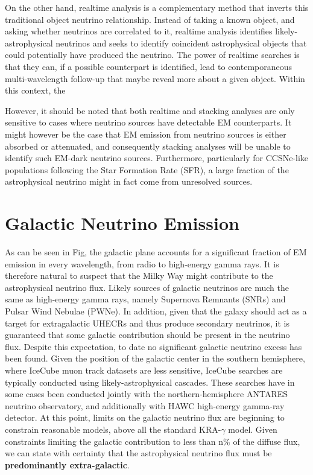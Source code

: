 On the other hand, realtime analysis is a complementary method that inverts this traditional object neutrino relationship. Instead of taking a known object, and asking whether neutrinos are correlated to it, realtime analysis identifies likely-astrophysical neutrinos and seeks to identify coincident astrophysical objects that could potentially have produced the neutrino. The power of realtime searches is that they can, if a possible counterpart is identified, lead to contemporaneous multi-wavelength follow-up that maybe reveal more about a given object. Within this context, the 

However, it should be noted that both realtime and stacking analyses are only sensitive to cases where neutrino sources have detectable EM counterparts. It might however be the case that EM emission from neutrino sources is either absorbed or attenuated, and consequently stacking analyses will be unable to identify such EM-dark neutrino sources. Furthermore, particularly for CCSNe-like populations following the Star Formation Rate (SFR), a large fraction of the astrophysical neutrino might in fact come from unresolved sources.

\section{Galactic Neutrino Emission}

As can be seen in Fig, the galactic plane accounts for a significant fraction of EM emission in every wavelength, from radio to high-energy gamma rays. It is therefore natural to suspect that the Milky Way might contribute to the astrophysical neutrino flux. Likely sources of galactic neutrinos are much the same as high-energy gamma rays, namely Supernova Remnants (SNRs) and Pulsar Wind Nebulae (PWNe). In addition, given that the galaxy should act as a target for extragalactic UHECRs and thus produce secondary neutrinos, it is guaranteed that some galactic contribution should be present in the neutrino flux. Despite this expectation, to date no significant galactic neutrino excess has been found. Given the position of the galactic center in the southern hemisphere, where IceCube muon track datasets are less sensitive, IceCube searches are typically conducted using likely-astrophysical cascades. These searches have in some cases been conducted jointly with the northern-hemisphere ANTARES neutrino observatory, and additionally with HAWC high-energy gamma-ray detector. At this point, limits on the galactic neutrino flux are beginning to constrain reasonable models, above all the standard KRA-$\gamma$ model. Given constraints limiting the galactic contribution to less than n\% of the diffuse flux, we can state with certainty that the astrophysical neutrino flux must be \textbf{predominantly extra-galactic}. 

